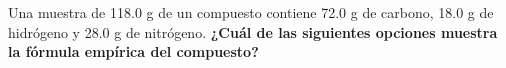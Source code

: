 Una muestra de 118.0 g de un compuesto contiene 72.0 g de carbono, 18.0 g de hidrógeno y 28.0 g de nitrógeno.
\textbf{¿Cuál de las siguientes opciones muestra la fórmula empírica del compuesto?}

\begin{choices}
    \choice {}
    \choice {}
    \choice {}
    \choice {}
\end{choices}